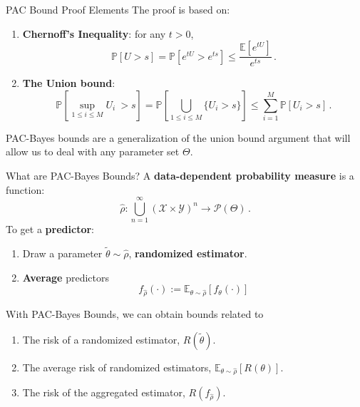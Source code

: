 \documentclass[aspectratio=159]{beamer}
\begin{document}
    \begin{frame}{PAC Bound Proof Elements}
        The proof is based on:
        \begin{enumerate}
            \item \textbf{Chernoff's Inequality}: for any \(t > 0\),
            \[
                \mathbb{P}[U > s] = \mathbb{P}\left[e^{tU}>e^{ts}\right] \leq \frac{\mathbb{E}\left[e^{tU}\right]}{e^{ts}}\,.
            \]
            \item \textbf{The Union bound}:
            \[
                \mathbb{P}\left[ \sup_{1\leq i \leq M}  U_i\ > s\right] = \mathbb{P}\left[ \bigcup_{1\leq i \leq M} \{U_i > s\}\right] \leq \sum_{i=1}^M \mathbb{P}\left[ U_i > s\right]\,.
            \]
        \end{enumerate}
        \pause
        PAC-Bayes bounds are a generalization of the union bound argument that will allow us to deal with any parameter set \(\Theta\).
    \end{frame}

    \begin{frame}{What are PAC-Bayes Bounds?}
        A \textbf{data-dependent probability measure} is a function:
        \[
            \hat{\rho}: \bigcup_{n=1}^{\infty} (\mathcal{X} \times \mathcal{Y})^n \to \mathcal{P}(\Theta)\,.
        \]
        To get a \textbf{predictor}:
        \begin{enumerate}
            \item Draw a parameter \(\tilde{\theta} \sim \hat{\rho}\), \textbf{randomized estimator}.
            \item \textbf{Average} predictors
            \[
                f_{\hat{\rho}}(\cdot) := \mathbb{E}_{\theta \sim \hat{\rho}}[f_\theta(\cdot)]
            \]
        \end{enumerate}
    \end{frame}
    \begin{frame}
        With PAC-Bayes Bounds, we can obtain bounds related to
        \begin{enumerate}
            \item The risk of a randomized estimator, \(R(\tilde{\theta})\).
            \item The average risk of randomized estimators, \(\mathbb{E}_{\theta \sim \hat{\rho}}[R(\theta)]\).
            \item The risk of the aggregated estimator, \(R(f_{\hat{\rho}})\).
        \end{enumerate}
    \end{frame}
\end{document}
